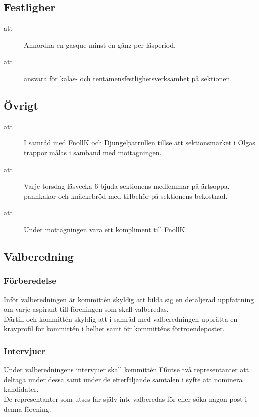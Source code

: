 \subsection{Festligher}
\begin{description}
\item[att] Annordna en gasque minst en gång per läsperiod.

\item[att] ansvara för kalas- och tentamensfestlighetsverksamhet på sektionen. 

\end{description}


\subsection{Övrigt}
\begin{description}
\item[att] I samråd med FnollK och Djungelpatrullen tillse att sektionsmärket i Olgas trappor målas i samband med mottagningen.

\item[att] Varje torsdag läsvecka 6 bjuda sektionens medlemmar på ärtsoppa, pannkakor och knäckebröd med tillbehör på sektionens bekostnad.

\item[att] Under mottagningen vara ett kompliment till FnollK.
\end{description}

\subsection{Valberedning}
\subsubsection{Förberedelse}
Inför valberedningen är kommittén skyldig att bilda sig en detaljerad uppfattning om varje aspirant till föreningen som skall valberedas.\\
Därtill och kommittén skyldig att i samråd med valberedningen upprätta en kravprofil för kommittén i helhet samt för kommitténs förtroendeposter.

\subsubsection{Intervjuer}
Under valberedningens intervjuer skall kommittén F6utse två representanter att deltaga under dessa samt under de efterföljande samtalen i syfte att nominera kandidater.\\
De representanter som utses får själv inte valberedas för eller söka någon post i denna förening.




